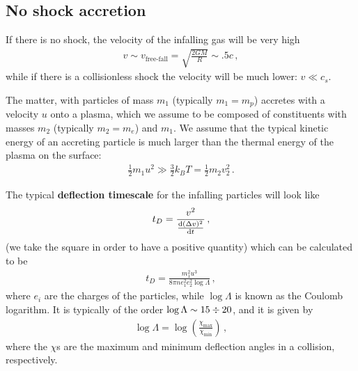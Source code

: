 \documentclass[main.tex]{subfiles}
\begin{document}
\subsection{No shock accretion}



If there is no shock, the velocity of the infalling gas will be very high
%
\begin{align}
v \sim v _{\text{free-fall}} = \sqrt{ \frac{2GM}{R}} \sim \num{.5} c
\,,
\end{align}
%
while if there is a collisionless shock the velocity will be much lower: \(v \ll c_s\).

The matter, with particles of mass \(m_1 \) (typically \(m_1 = m_p\)) accretes with a velocity \(u\) onto a plasma, which we assume to be composed of constituents with masses \(m_2 \) (typically \(m_2 = m_e\)) and \(m_1\).
We assume that the typical kinetic energy of an accreting particle is much larger than the thermal energy of the plasma on the surface:
%
\begin{align}
\frac{1}{2 } m_1 u^2 \gg \frac{3}{2} k_B T = \frac{1}{2} m_2 v_2^2
\,.
\end{align}


The typical \textbf{deflection timescale} for the infalling particles will look like 
%
\begin{align}
t_D = \frac{v^2}{\dv{(\Delta v)^2}{t}}
\,,
\end{align}
%
(we take the square in order to have a positive quantity)  which can be calculated to be 
%
\begin{align}
t_D = \frac{m_1^2 u^3}{8 \pi n e_1^2 e_2^2 \log \Lambda }
\,,
\end{align}
%
where \(e_i\) are the charges of the particles, while \(\log \Lambda \) is known as the Coulomb logarithm. It is typically of the order \(\log \Lambda \sim 15 \divisionsymbol 20\), and it is given by 
%
\begin{align}
\log \Lambda = \log( \frac{\chi _{\text{max}}}{\chi _{\text{min}}})
\,,
\end{align}
%
where the \(\chi \)s are the maximum and minimum deflection angles in a collision, respectively.
\end{document}
